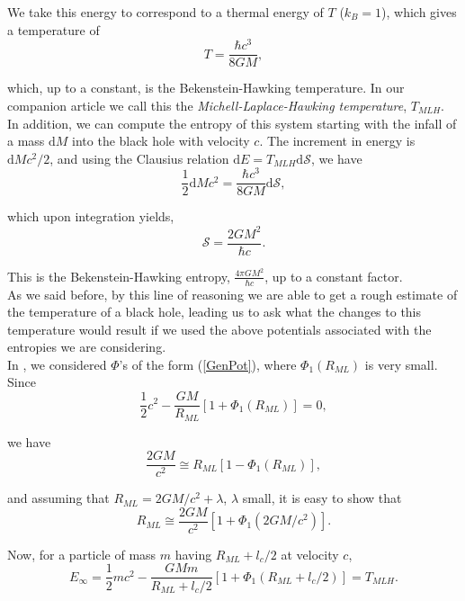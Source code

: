\documentclass[nofootinbib,aps,prd,preprint,groupedaddress,showpacs,showkeys]{revtex4-1}
\newcommand{\dif}{\mathrm{d}}
\begin{document}
\noindent We take this energy to correspond to a thermal energy of $T$ ($k_B = 1$), which gives a temperature of
\begin{equation}
T = \frac{\hbar c^3}{8 G M},
\end{equation}

\noindent which, up to a constant, is the Bekenstein-Hawking temperature. In our companion article we call this the \textit{Michell-Laplace-Hawking temperature}, $T_{MLH}$.\\
\indent In addition, we can compute the entropy of this system starting with the infall of a mass $\dif M$ into the black hole with velocity $c$. The increment in energy is $\dif M c^2 /2$, and using the Clausius relation $\dif E = T_{MLH} \dif \mathcal{S}$, we have
\begin{equation}
\frac{1}{2} \dif M c^2 = \frac{\hbar c^3}{8 GM} \dif \mathcal{S}, \label{Clausius}
\end{equation}

\noindent which upon integration yields,
\begin{equation}
\mathcal{S} = \frac{2 GM^2}{\hbar c}.
\end{equation}

\noindent This is the Bekenstein-Hawking entropy, $\frac{4 \pi GM^2}{\hbar c}$, up to a constant factor.\\
\indent As we said before, by this line of reasoning we are able to get a rough estimate of the temperature of a black hole, leading us to ask what the changes to this temperature would result if we used the above potentials associated with the entropies we are considering.\\
\indent In \cite{MOR}, we considered $\Phi$'s of the form (\ref{GenPot}), where $\Phi_1 (R_{ML})$ is very small. Since
\begin{equation}
\frac{1}{2} c^2 - \frac{GM}{R_{ML}} [1 + \Phi_1 (R_{ML})] = 0, \label{MLCondition}
\end{equation}

\noindent we have
\begin{equation}
\frac{2 GM}{c^2} \cong R_{ML} [1 - \Phi_1(R_{ML})],
\end{equation}

\noindent and assuming that $R_{ML} = 2GM/c^2 + \lambda$, $\lambda$ small, it is easy to show that
\begin{equation}
R_{ML} \cong \frac{2GM}{c^2} [1 + \Phi_1(2GM/c^2)].
\end{equation}

\noindent Now, for a particle of mass $m$ having $R_{ML} + l_c /2$ at velocity $c$,
\begin{equation}
E_{\infty} = \frac{1}{2} mc^2 - \frac{GMm}{R_{ML} + l_c/2} [1 + \Phi_1(R_{ML} + l_c/2)] = T_{MLH}.
\end{equation}
\end{document}
